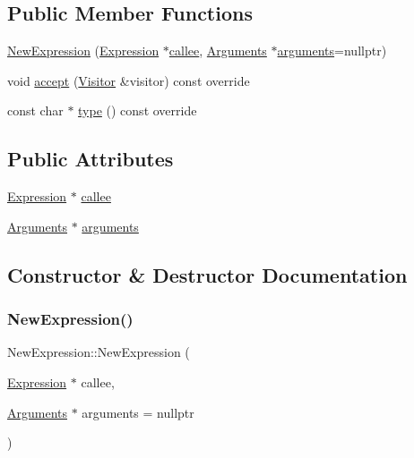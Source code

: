 \subsection*{Public Member Functions}
\begin{DoxyCompactItemize}
\item 
\hyperlink{struct_new_expression_a8a97ab4337fec49be339e232c1992fcb}{New\+Expression} (\hyperlink{struct_expression}{Expression} $\ast$\hyperlink{struct_new_expression_aa56c9b8daa3725a54fdb2b8fce63d237}{callee}, \hyperlink{struct_arguments}{Arguments} $\ast$\hyperlink{struct_new_expression_a4d43c4128966ccb728f92a0204d04eaa}{arguments}=nullptr)
\item 
void \hyperlink{struct_new_expression_a02f3b4798c1351cee31f27d0cbf6346f}{accept} (\hyperlink{struct_visitor}{Visitor} \&visitor) const override
\item 
const char $\ast$ \hyperlink{struct_new_expression_a30486948a74f6c149f0c8a05b580b360}{type} () const override
\end{DoxyCompactItemize}
\subsection*{Public Attributes}
\begin{DoxyCompactItemize}
\item 
\hyperlink{struct_expression}{Expression} $\ast$ \hyperlink{struct_new_expression_aa56c9b8daa3725a54fdb2b8fce63d237}{callee}
\item 
\hyperlink{struct_arguments}{Arguments} $\ast$ \hyperlink{struct_new_expression_a4d43c4128966ccb728f92a0204d04eaa}{arguments}
\end{DoxyCompactItemize}


\subsection{Constructor \& Destructor Documentation}
\mbox{\label{struct_new_expression_a8a97ab4337fec49be339e232c1992fcb}} 
\subsubsection{\texorpdfstring{New\+Expression()}{NewExpression()}}
{\footnotesize\ttfamily New\+Expression\+::\+New\+Expression (\begin{DoxyParamCaption}\item[{\hyperlink{struct_expression}{Expression} $\ast$}]{callee,  }\item[{\hyperlink{struct_arguments}{Arguments} $\ast$}]{arguments = {\ttfamily nullptr} }\end{DoxyParamCaption})\hspace{0.3cm}{\ttfamily [inline]}}



